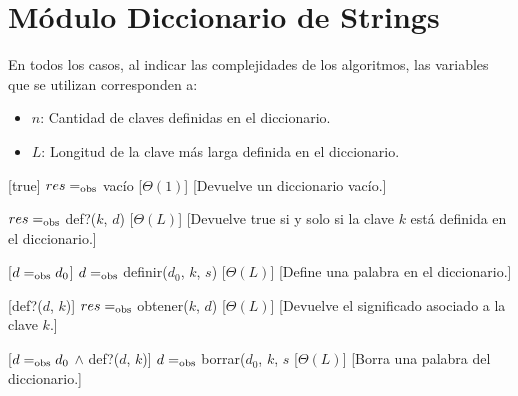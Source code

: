 \section{M\'{o}dulo Diccionario de Strings}

  En todos los casos, al indicar las complejidades de los algoritmos, las variables que se utilizan corresponden a:
  \vspace{-0.5em}\begin{itemize}
    \item $n$: Cantidad de claves definidas en el diccionario.
    \item $L$: Longitud de la clave m\'as larga definida en el diccionario.
  \end{itemize}

\begin{Interfaz}
  
  \begin{paramFormales}
    \paramGeneros{$\alpha$}

    

  \end{paramFormales}




    [true]
    {$res =_{\mathrm{obs}}$ vac\'{i}o}
    [$\Theta(1)$]
    [Devuelve un diccionario vac\'io.]

    {$res =_{\mathrm{obs}}$ def?($k$, $d$)}
    [$\Theta(L)$]
    [Devuelve true si y solo si la clave $k$ est\'a definida en el diccionario.]

    [$d =_{\mathrm{obs}} d_{0}$]
    {$d =_{\mathrm{obs}}$ definir($d_{0}$, $k$, $s$)}
    [$\Theta(L)$]
    [Define una palabra en el diccionario.]

    [def?($d$, $k$)]
    {$res =_{\mathrm{obs}}$ obtener($k$, $d$)}
    [$\Theta(L)$]
    [Devuelve el significado asociado a la clave $k$.]

    [$d =_{\mathrm{obs}} d_{0}$ $\land$ def?($d$, $k$)]
    {$d =_{\mathrm{obs}}$ borrar($d_{0}$, $k$, $s$}
    [$\Theta(L)$]
    [Borra una palabra del diccionario.]

\end{Interfaz}
